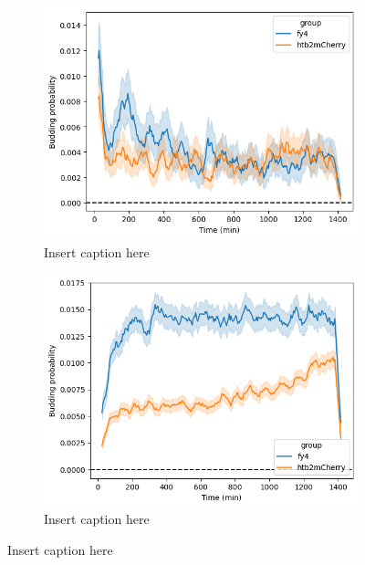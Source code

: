 \begin{figure}
  \begin{subfigure}[htpb]{0.45\textwidth}
   \centering
   \includegraphics[width=\textwidth]{allstrains_31492_budprob}
   \caption{
     Insert caption here
   }
   \label{fig:biology-lowglc-budprob}
  \end{subfigure}%
  \begin{subfigure}[htpb]{0.45\textwidth}
   \centering
   \includegraphics[width=\textwidth]{allstrains_26643_budprob}
   \caption{
     Insert caption here
   }
   \label{fig:biology-highglc-gr}
  \end{subfigure}

  \caption{
    Insert caption here
  }
  \label{fig:biology-lowglc-gr-budprob}
\end{figure}



